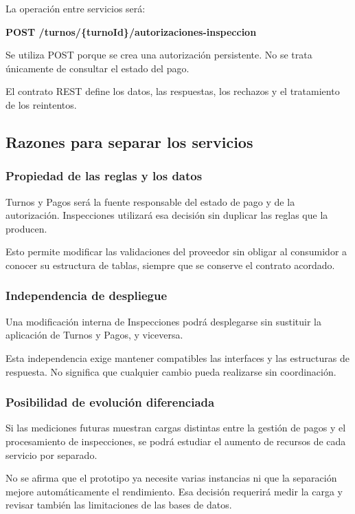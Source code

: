 \documentclass[11pt,a4paper]{article}
\begin{document}
La operación entre servicios será:

\textbf{POST /turnos/\{turnoId\}/autorizaciones-inspeccion}

Se utiliza POST porque se crea una autorización persistente. No se trata únicamente de consultar el estado del pago.

El contrato REST define los datos, las respuestas, los rechazos y el tratamiento de los reintentos.

\subsection{Razones para separar los servicios}

\subsubsection{Propiedad de las reglas y los datos}

Turnos y Pagos será la fuente responsable del estado de pago y de la autorización. Inspecciones utilizará esa decisión sin duplicar las reglas que la producen.

Esto permite modificar las validaciones del proveedor sin obligar al consumidor a conocer su estructura de tablas, siempre que se conserve el contrato acordado.

\subsubsection{Independencia de despliegue}

Una modificación interna de Inspecciones podrá desplegarse sin sustituir la aplicación de Turnos y Pagos, y viceversa.

Esta independencia exige mantener compatibles las interfaces y las estructuras de respuesta. No significa que cualquier cambio pueda realizarse sin coordinación.

\subsubsection{Posibilidad de evolución diferenciada}

Si las mediciones futuras muestran cargas distintas entre la gestión de pagos y el procesamiento de inspecciones, se podrá estudiar el aumento de recursos de cada servicio por separado.

No se afirma que el prototipo ya necesite varias instancias ni que la separación mejore automáticamente el rendimiento. Esa decisión requerirá medir la carga y revisar también las limitaciones de las bases de datos.
\end{document}
